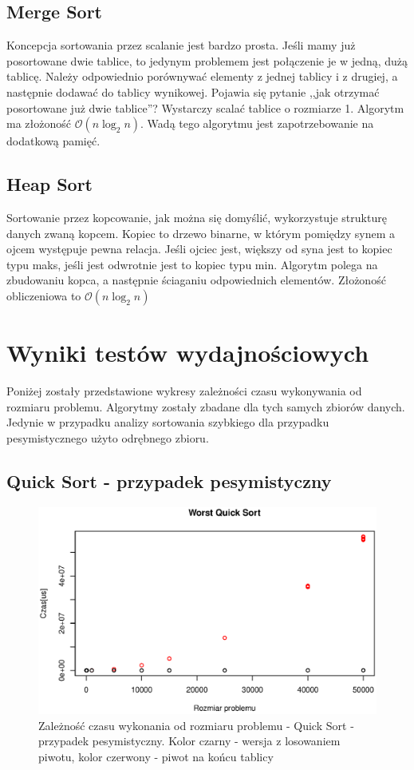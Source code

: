 \documentclass[10pt,a4paper]{article}
\begin{document}
\subsection{Merge Sort}

Koncepcja sortowania przez scalanie jest bardzo prosta. Jeśli mamy już posortowane dwie tablice,
to jedynym problemem jest połączenie je w jedną, dużą tablicę. Należy odpowiednio porównywać
elementy z jednej tablicy i z drugiej, a następnie dodawać do tablicy wynikowej. Pojawia się
pytanie ,,jak otrzymać posortowane już dwie tablice''? Wystarczy scalać tablice o rozmiarze 1.
Algorytm ma złożoność $\mathcal{O}(n\log_2 n )$. Wadą tego algorytmu jest zapotrzebowanie na
dodatkową pamięć.

\subsection{Heap Sort}

Sortowanie przez kopcowanie, jak można się domyślić, wykorzystuje strukturę danych zwaną kopcem.
Kopiec to drzewo binarne, w którym pomiędzy synem a ojcem występuje pewna relacja. Jeśli ojciec jest,
większy od syna jest to kopiec typu maks, jeśli jest odwrotnie jest to kopiec typu min. Algorytm polega
na zbudowaniu kopca, a następnie ściaganiu odpowiednich elementów. Złożoność obliczeniowa to 
$\mathcal{O}(n\log_2 n)$

\section{Wyniki testów wydajnościowych}

Poniżej zostały przedstawione wykresy zależności czasu wykonywania od rozmiaru problemu.
Algorytmy zostały zbadane dla tych samych zbiorów danych. Jedynie w przypadku analizy 
sortowania szybkiego dla przypadku pesymistycznego użyto odrębnego zbioru.

\subsection{Quick Sort - przypadek pesymistyczny}

\begin{figure}[H]
\centering
\includegraphics[width=0.7\linewidth]{./Wykresy/quickSortWorstBench}
\caption{Zależność czasu wykonania od rozmiaru problemu - Quick Sort - przypadek pesymistyczny. Kolor czarny - wersja z losowaniem piwotu,
kolor czerwony - piwot na końcu tablicy}
\label{fig:quickSortWorstBench}
\end{figure}
\end{document}
